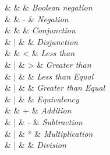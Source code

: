 \begin{syntax}
  \neg & \Coloneqq{} & \neg    & \emph{Boolean negation} \\
  [1.5ex]
  \integerUnary & \Coloneqq{} & - & \emph{Negation} \\
  [1.5ex]

  \boolFuncs & \Coloneqq{} & \wedge & \textit{Conjunction} \\
                      &      |      & \vee  & \textit{Disjunction} \\
  [1.5ex]

  \inequalities & \Coloneqq{} & <   & \textit{Less than} \\
                      &     |       & >   & \textit{Greater than} \\
                      &     |       & \leq  & \textit{Less than Equal} \\
                      &     |       & \geq  & \textit{Greater than Equal} \\
                      &     |       & \equiv  & \textit{Equivalency} \\
  [1.5ex]

  \integerFuncs & \Coloneqq{} & +   & \textit{Addition} \\
                      &     |       & -   & \textit{Subtraction} \\
                      &     |       & *  & \textit{Multiplication} \\
                      &     |       & \div & \textit{Division} \\
\end{syntax}
